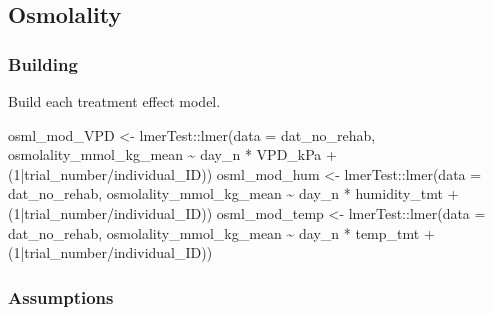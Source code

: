\documentclass[
]{article}
\newenvironment{Shaded}{\begin{snugshade}}{\end{snugshade}}
\newcommand{\AttributeTok}[1]{\textcolor[rgb]{0.77,0.63,0.00}{#1}}
\newcommand{\DecValTok}[1]{\textcolor[rgb]{0.00,0.00,0.81}{#1}}
\newcommand{\FunctionTok}[1]{\textcolor[rgb]{0.00,0.00,0.00}{#1}}
\newcommand{\NormalTok}[1]{#1}
\newcommand{\OtherTok}[1]{\textcolor[rgb]{0.56,0.35,0.01}{#1}}
\newcommand{\SpecialCharTok}[1]{\textcolor[rgb]{0.00,0.00,0.00}{#1}}
\begin{document}
\hypertarget{osmolality}{%
\subsection{Osmolality}\label{osmolality}}

\hypertarget{building-2}{%
\subsubsection{Building}\label{building-2}}

Build each treatment effect model.

\begin{Shaded}
\begin{Highlighting}[]
\NormalTok{osml\_mod\_VPD }\OtherTok{\textless{}{-}}\NormalTok{ lmerTest}\SpecialCharTok{::}\FunctionTok{lmer}\NormalTok{(}\AttributeTok{data =}\NormalTok{ dat\_no\_rehab,}
\NormalTok{                               osmolality\_mmol\_kg\_mean }\SpecialCharTok{\textasciitilde{}}\NormalTok{ day\_n }\SpecialCharTok{*}\NormalTok{ VPD\_kPa }\SpecialCharTok{+}
\NormalTok{                              (}\DecValTok{1}\SpecialCharTok{|}\NormalTok{trial\_number}\SpecialCharTok{/}\NormalTok{individual\_ID))}
\NormalTok{osml\_mod\_hum }\OtherTok{\textless{}{-}}\NormalTok{ lmerTest}\SpecialCharTok{::}\FunctionTok{lmer}\NormalTok{(}\AttributeTok{data =}\NormalTok{ dat\_no\_rehab,}
\NormalTok{                               osmolality\_mmol\_kg\_mean }\SpecialCharTok{\textasciitilde{}}\NormalTok{ day\_n }\SpecialCharTok{*}\NormalTok{ humidity\_tmt }\SpecialCharTok{+}
\NormalTok{                              (}\DecValTok{1}\SpecialCharTok{|}\NormalTok{trial\_number}\SpecialCharTok{/}\NormalTok{individual\_ID))}
\NormalTok{osml\_mod\_temp }\OtherTok{\textless{}{-}}\NormalTok{ lmerTest}\SpecialCharTok{::}\FunctionTok{lmer}\NormalTok{(}\AttributeTok{data =}\NormalTok{ dat\_no\_rehab,}
\NormalTok{                               osmolality\_mmol\_kg\_mean }\SpecialCharTok{\textasciitilde{}}\NormalTok{ day\_n }\SpecialCharTok{*}\NormalTok{ temp\_tmt }\SpecialCharTok{+}
\NormalTok{                              (}\DecValTok{1}\SpecialCharTok{|}\NormalTok{trial\_number}\SpecialCharTok{/}\NormalTok{individual\_ID))}
\end{Highlighting}
\end{Shaded}

\hypertarget{assumptions-2}{%
\subsubsection{Assumptions}\label{assumptions-2}}
\end{document}
